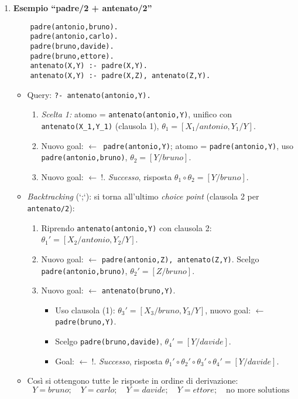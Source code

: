 \documentclass[12pt]{article}
\begin{document}
\begin{enumerate}
  \item \textbf{Esempio “padre/2 + antenato/2”}
    \begin{verbatim}
    padre(antonio,bruno).
    padre(antonio,carlo).
    padre(bruno,davide).
    padre(bruno,ettore).
    antenato(X,Y) :- padre(X,Y).
    antenato(X,Y) :- padre(X,Z), antenato(Z,Y).
    \end{verbatim}
    \begin{itemize}
      \item Query: \texttt{?- antenato(antonio,Y).}
      \begin{enumerate}
        \item \emph{Scelta 1:} atomo = \texttt{antenato(antonio,Y)}, unifico con \texttt{antenato(X\_1,Y\_1)} (clausola 1), $\theta_1 = [X_1/antonio, Y_1/Y]$.
        \item Nuovo goal: \texttt{$\leftarrow$ padre(antonio,Y)}; atomo = \texttt{padre(antonio,Y)}, uso \texttt{padre(antonio,bruno)}, $\theta_2 = [Y/bruno]$.
        \item Nuovo goal: $\leftarrow\ !$. \emph{Successo}, risposta $\theta_1 \circ \theta_2 = [Y/bruno]$.
      \end{enumerate}
      \item \emph{Backtracking} (`;`): si torna all’ultimo \emph{choice point} (clausola 2 per \texttt{antenato/2}):
      \begin{enumerate}
        \item Riprendo \texttt{antenato(antonio,Y)} con clausola 2: $\theta_1' = [X_2/antonio, Y_2/Y]$.
        \item Nuovo goal: $\leftarrow$ \texttt{padre(antonio,Z), antenato(Z,Y)}. Scelgo \texttt{padre(antonio,bruno)}, $\theta_2' = [Z/bruno]$.
        \item Nuovo goal: $\leftarrow$ \texttt{antenato(bruno,Y)}.
        \begin{itemize}
          \item Uso clausola (1): $\theta_3' = [X_3/bruno, Y_3/Y]$, nuovo goal: $\leftarrow$ \texttt{padre(bruno,Y)}.
          \item Scelgo \texttt{padre(bruno,davide)}, $\theta_4' = [Y/davide]$.
          \item Goal: $\leftarrow\ !$. \emph{Successo}, risposta $\theta_1'\circ\theta_2'\circ\theta_3'\circ\theta_4' = [Y/davide]$.
        \end{itemize}
      \end{enumerate}
      \item Così si ottengono tutte le risposte in ordine di derivazione:
      \[
        Y = bruno;\quad Y = carlo;\quad Y = davide;\quad Y = ettore;\quad \text{no more solutions}
      \]
    \end{itemize}


\end{enumerate}
\end{document}
